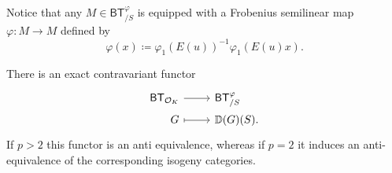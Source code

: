 \documentclass[../Main]{subfiles}
\begin{document}
\noindent
Notice that any $M \in \mathsf{BT}^{\varphi}_{/S}$ is equipped with a Frobenius
semilinear map $\varphi\colon M \to M$ defined by
\begin{equation*}
	\varphi (x) \coloneqq \varphi_1 \left( E(u) \right)^{-1} \varphi_1 (E(u)x)
.\end{equation*}


\begin{prop}
	There is an exact contravariant functor
	\begin{equation*}
	\begin{tikzcd}[row sep = 0ex
		,/tikz/column 1/.append style={anchor=base east}
		,/tikz/column 2/.append style={anchor=base west}]
		\mathsf{BT}_{\mathcal{O}_{ K }} \arrow[r, "", rightarrow] &
		\mathsf{BT}^{\varphi}_{/S} \\
		G \arrow[r, "", mapsto] & 
		\mathbb{D}(G)(S)
	.\end{tikzcd}
	\end{equation*} 
	If $p > 2$ this functor is an anti equivalence,
	whereas if $p = 2$ it induces an anti-equivalence of the 
	corresponding isogeny categories.
\end{prop}
\end{document}

